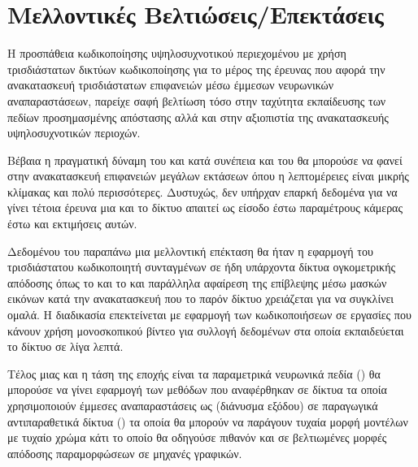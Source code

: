 \section{Μελλοντικές Βελτιώσεις/Επεκτάσεις}
\label{section:futureworks}
Η προσπάθεια κωδικοποίησης υψηλοσυχνοτικού περιεχομένου με χρήση τρισδιάστατων δικτύων κωδικοποίησης για το μέρος της έρευνας που αφορά την ανακατασκευή τρισδιάστατων επιφανειών μέσω έμμεσων νευρωνικών αναπαραστάσεων, παρείχε σαφή βελτίωση τόσο στην ταχύτητα εκπαίδευσης των πεδίων προσημασμένης απόστασης αλλά και στην αξιοπιστία της ανακατασκευής υψηλοσυχνοτικών περιοχών. 

Βέβαια η πραγματική δύναμη του  και κατά συνέπεια και του  θα μπορούσε να φανεί στην ανακατασκευή επιφανειών μεγάλων εκτάσεων όπου η λεπτομέρειες είναι μικρής κλίμακας και πολύ περισσότερες. Δυστυχώς, δεν υπήρχαν επαρκή δεδομένα για να γίνει τέτοια έρευνα μια και το δίκτυο απαιτεί ως είσοδο έστω παραμέτρους κάμερας έστω και εκτιμήσεις αυτών. 

Δεδομένου του παραπάνω μια μελλοντική επέκταση θα ήταν η εφαρμογή του τρισδιάστατου κωδικοποιητή συνταγμένων σε ήδη υπάρχοντα δίκτυα ογκομετρικής απόδοσης όπως το \cite{mildenhall2020nerf} και το  \cite{DBLP:journals/corr/abs-2106-10689} και παράλληλα αφαίρεση της επίβλεψης μέσω μασκών εικόνων κατά την ανακατασκευή που το παρόν δίκτυο χρειάζεται για να συγκλίνει ομαλά. Η διαδικασία επεκτείνεται με εφαρμογή των κωδικοποιήσεων σε εργασίες που κάνουν χρήση μονοσκοπικού βίντεο για συλλογή δεδομένων στα οποία εκπαιδεύεται το δίκτυο σε λίγα λεπτά. 

Τέλος μιας και η τάση της εποχής είναι τα παραμετρικά νευρωνικά πεδία () θα μπορούσε να γίνει εφαρμογή των μεθόδων που αναφέρθηκαν σε δίκτυα τα οποία χρησιμοποιούν έμμεσες αναπαραστάσεις ως  (διάνυσμα εξόδου) σε παραγωγικά αντιπαραθετικά δίκτυα () τα οποία θα μπορούν να παράγουν τυχαία μορφή  μοντέλων με τυχαίο χρώμα κάτι το οποίο θα οδηγούσε πιθανόν και σε βελτιωμένες μορφές απόδοσης παραμορφώσεων σε μηχανές γραφικών.
